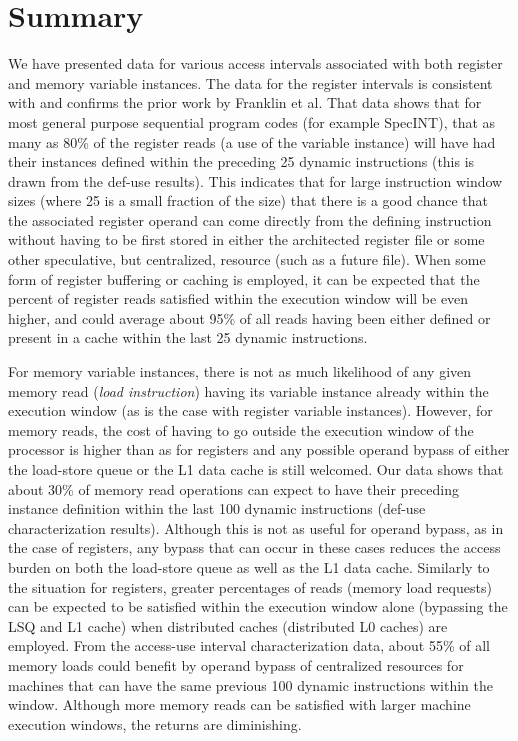 \documentclass[10pt,dvips]{article}
\begin{document}
\section{Summary}
%
We have presented data for various access intervals associated
with both register and memory variable instances.
The data for the register intervals is consistent with and
confirms the prior work by Franklin et al.
That data shows that for most general purpose sequential program
codes (for example SpecINT), that as many as
80\% of the register reads (a use
of the variable instance) will have had their instances defined within
the preceding 25 dynamic instructions (this is drawn from the def-use
results).  
This indicates
that for large instruction window sizes (where 25 is a small fraction of
the size) that there is a good chance that the associated register
operand can come directly from the defining instruction without
having to be first stored in either the architected register
file or some other speculative, but 
centralized, resource (such as a future file).
When some form of register buffering or caching is employed, it
can be expected that the percent of register reads satisfied within
the execution window will be even higher, and could average about 95\%
of all reads having been either defined or present in a cache within
the last 25 dynamic instructions.

For memory variable instances, there is not as much likelihood
of any given memory read (\textit{load instruction}) having its
variable instance already within the execution window (as is the
case with register variable instances).
However, for memory reads, the cost of having to go outside
the execution window of the processor is higher than as for registers
and any possible
operand bypass of either the load-store queue or the
L1 data cache is still welcomed.
Our data shows that about 30\% of memory read operations
can expect to have their preceding instance definition within
the last 100 dynamic instructions (def-use characterization results).
Although this is not as useful for operand bypass, as in the case of 
registers, any bypass that can occur in these cases reduces the
access burden on both the load-store queue as well as the L1
data cache.
Similarly to the situation for registers, greater percentages of reads
(memory load requests) can be expected to be satisfied within
the execution window alone (bypassing the LSQ and L1 cache)
when distributed caches (distributed L0 caches) are employed.
From the access-use interval characterization data, about 55\% of
all memory loads could benefit by operand bypass of centralized
resources for machines that can have the same previous 100
dynamic instructions within the window.
Although more memory reads can be satisfied with larger machine
execution windows, the returns are diminishing.
\end{document}
